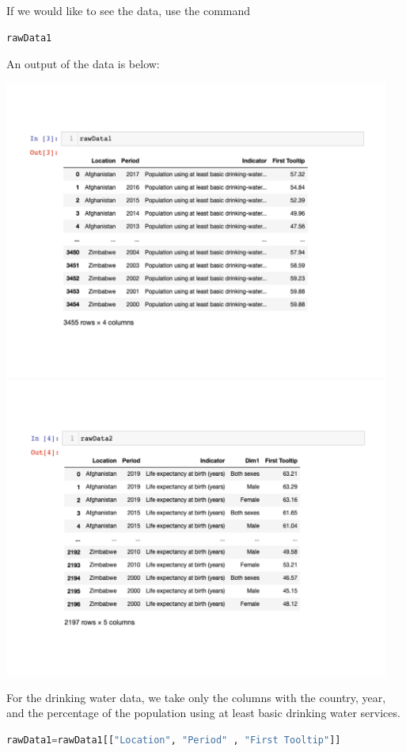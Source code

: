 \documentclass[12pt]{article}
\begin{document}
If we would like to see the data, use the command
\begin{adjustwidth}{0.5in}{0.25in}
\begin{lstlisting}[language=Python]
rawData1
\end{lstlisting}
\end{adjustwidth}

An output of the data is below:

\begin{center}
\includegraphics[width=5in]{figure1.pdf}
\includegraphics[width=5in]{figure2.pdf}
\end{center}

For the drinking water data, we take only the columns with the country, year, and the percentage of the population using at least basic drinking water services.
\begin{adjustwidth}{0.5in}{0.25in}
\begin{lstlisting}[language=Python]
rawData1=rawData1[["Location", "Period" , "First Tooltip"]]
\end{lstlisting}
\end{adjustwidth}
\end{document}

